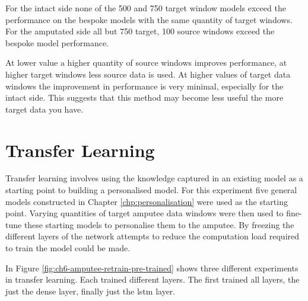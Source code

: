 For the intact side none of the 500 and 750 target window models exceed the performance on the bespoke models with the same quantity of target windows. For the amputated side all but 750 target, 100 source windows exceed the bespoke model performance.

At lower value a higher quantity of source windows improves performance, at higher target windows less source data is used. At higher values of target data windows the improvement in performance is very minimal, especially for the intact side. This suggests that this method may become less useful the more target data you have.

\section{Transfer Learning}
\label{sec:amputee-transfer}
Transfer learning involves using the knowledge captured in an existing model as a starting point to building a personalised model. For this experiment five general models constructed in Chapter \ref{chp:personalisation} were used as the starting point. Varying quantities of target amputee data windows were then used to fine-tune these starting models to personalise them to the amputee. By freezing the different layers of the network attempts to reduce the computation load required to train the model could be made.

In Figure \ref{fig:ch6-amputee-retrain-pre-trained} shows three different experiments in transfer learning. Each trained different layers. The first trained all layers, the just the dense layer, finally just the \acrshort{lstm} layer.

